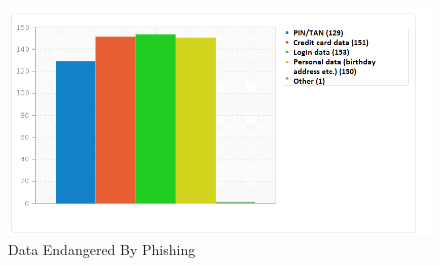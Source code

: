 \begin{figure}[hHtbp]
\includegraphics[width=1.0\textwidth]{graphix/endangered_data.png}%
\caption{Data Endangered By Phishing}%
\label{fig:endangered_data}%
\end{figure}